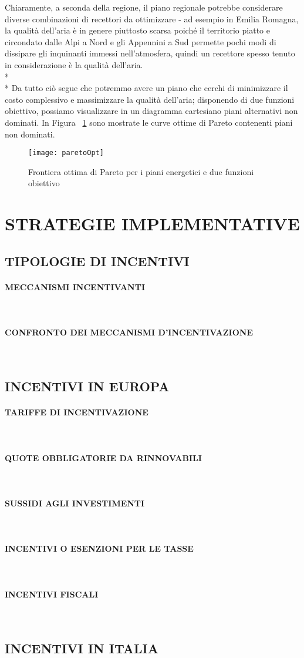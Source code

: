 \documentclass[12pt,a4paper,openright,twoside]{report}
\newcommand{\myparagraph}[1]{\paragraph{#1}\mbox{}\\}
\begin{document}
Chiaramente, a seconda della regione, il piano regionale potrebbe considerare diverse combinazioni di recettori da ottimizzare - ad esempio in Emilia Romagna, la qualità dell'aria è in genere piuttosto scarsa poiché il territorio piatto e circondato dalle Alpi a Nord e gli Appennini a Sud permette pochi modi di dissipare gli inquinanti immessi nell'atmosfera, quindi un recettore spesso tenuto in considerazione è la qualità dell'aria.\\*\\*
Da tutto ciò segue che potremmo avere un piano che cerchi di minimizzare il costo complessivo e massimizzare la qualità dell'aria; disponendo di due funzioni obiettivo, possiamo visualizzare in un diagramma cartesiano piani alternativi non dominati. In Figura ~\ref{paretoOpt} sono mostrate le curve ottime di Pareto contenenti piani non dominati.

\begin{figure}[hbt]
	\centering
	\texttt{[image: paretoOpt]}
	\caption{Frontiera ottima di Pareto per i piani energetici e due funzioni obiettivo}
	\label{paretoOpt}
\end{figure}


\section{\nohyphens{STRATEGIE IMPLEMENTATIVE}}

\subsection[INCENTIVI]{\nohyphens{TIPOLOGIE DI INCENTIVI}}

\myparagraph{MECCANISMI INCENTIVANTI}

\myparagraph{CONFRONTO DEI MECCANISMI D'INCENTIVAZIONE}

\subsection[INCENTIVI EUROPEI]{\nohyphens{INCENTIVI IN EUROPA}}

\myparagraph{TARIFFE DI INCENTIVAZIONE}

\myparagraph{QUOTE OBBLIGATORIE DA RINNOVABILI}

\myparagraph{SUSSIDI AGLI INVESTIMENTI}

\myparagraph{INCENTIVI O ESENZIONI PER LE TASSE}

\myparagraph{INCENTIVI FISCALI}


\subsection[INCENTIVI ITALIANI]{\nohyphens{INCENTIVI IN ITALIA}}
\end{document}
